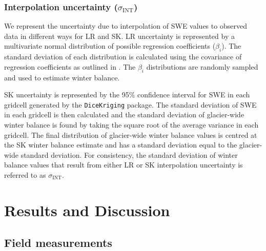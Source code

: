 \documentclass[twocolumn, letterpaper]{igs}
\begin{document}
	\subsubsection{Interpolation uncertainty ($\sigma_{\mathrm{INT}}$)}
We represent the uncertainty due to interpolation of SWE values to observed data in different ways for LR and SK. LR uncertainty is represented by a multivariate normal distribution of possible regression coefficients ($\beta_i$). The standard deviation of each distribution is calculated using the covariance of regression coefficients as outlined in \cite{Bagos2015}. The $\beta_i$ distributions are randomly sampled and used to estimate winter balance.

SK uncertainty is represented by the 95\% confidence interval for SWE in each gridcell generated by the \texttt{DiceKriging} package. The standard deviation of SWE in each gridcell is then calculated and the standard deviation of glacier-wide winter balance is found by taking the square root of the average variance in each gridcell. The final distribution of glacier-wide winter balance values is centred at the SK winter balance estimate and has a standard deviation equal to the glacier-wide standard deviation. For consistency, the standard deviation of winter balance values that result from either LR or SK interpolation uncertainty is referred to as $\sigma_{\mathrm{INT}}$.



\section{Results and Discussion}

\subsection{Field measurements}
\end{document}
